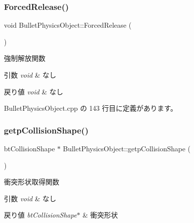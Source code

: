 \subsubsection{\texorpdfstring{Forced\+Release()}{ForcedRelease()}}
{\footnotesize\ttfamily void Bullet\+Physics\+Object\+::\+Forced\+Release (\begin{DoxyParamCaption}{ }\end{DoxyParamCaption})}



強制解放関数 


\begin{DoxyParams}{引数}
{\em void} & なし \\
\hline
\end{DoxyParams}

\begin{DoxyRetVals}{戻り値}
{\em void} & なし \\
\hline
\end{DoxyRetVals}


 Bullet\+Physics\+Object.\+cpp の 143 行目に定義があります。

\mbox{\label{class_bullet_physics_object_a436ec7f8e40865bc240eaf5669a43bf9}} 
\subsubsection{\texorpdfstring{getp\+Collision\+Shape()}{getpCollisionShape()}}
{\footnotesize\ttfamily bt\+Collision\+Shape $\ast$ Bullet\+Physics\+Object\+::getp\+Collision\+Shape (\begin{DoxyParamCaption}{ }\end{DoxyParamCaption})}



衝突形状取得関数 


\begin{DoxyParams}{引数}
{\em void} & なし \\
\hline
\end{DoxyParams}

\begin{DoxyRetVals}{戻り値}
{\em bt\+Collision\+Shape$\ast$} & 衝突形状 \\
\hline
\end{DoxyRetVals}


